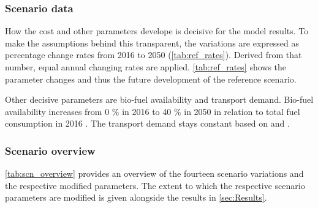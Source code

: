 \documentclass[article]{elsarticle}
\begin{document}
\subsubsection{Scenario data}
How the cost and other parameters develope is decisive for the model results. To make the assumptions behind this transparent, the variations are expressed as percentage change rates from 2016 to 2050 (\autoref{tab:ref_rates}). Derived from that number, equal annual changing rates are applied. \autoref{tab:ref_rates} shows the parameter changes and thus the future development of the reference scenario.

Other decisive parameters are bio-fuel availability and transport demand. Bio-fuel availability increases from 0 \% in 2016 to 40 \% in 2050 in relation to total fuel consumption in 2016 \cite{DEA2016}. The transport demand stays constant based on \cite[p.~18]{ITF2018} and \cite[p.~19]{Rex2017}.


\subsubsection{Scenario overview}
\autoref{tab:scn_overview} provides an overview of the fourteen scenario variations and the respective modified parameters. The extent to which the respective scenario parameters are modified is given alongside the results in \autoref{sec:Results}.
\end{document}
